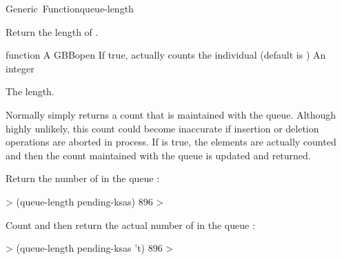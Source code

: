 \documentclass[10pt,twoside,english,pdftex]{article}
\begin{document}
\begin{functiondoc}{Generic~Function}{queue-length}{
    }
%
%

\fnsyntax

\fnpurpose Return the length of .

\fnmethods
{} 

\fnpackage {}

\fnmodule {}

\fnargs
\begin{args}{function}
\arg[queue] A GBBopen 
\arg[recount-p] If true, actually counts the individual
 (default is \nil) 
\arg[integer] An integer
\end{args}

\fnreturns The  length.

\fndescription Normally  simply returns a count
that is maintained with the queue.  Although highly unlikely, this count could
become inaccurate if  insertion or deletion operations
are aborted in process. If  is true, the elements are
actually counted and then the count maintained with the queue is updated and
returned.

\fnexamples
Return the number of  in the queue :
%
\W\supp
\begin{example}
  > (queue-length pending-ksas)
  896
  >
\end{example}
%
Count and then return the actual number of  in the
queue :
%
\W\supp\notpretop
\begin{example}
  > (queue-length pending-ksas 't)
  896
  >
\end{example}

\end{functiondoc}

\end{document}
